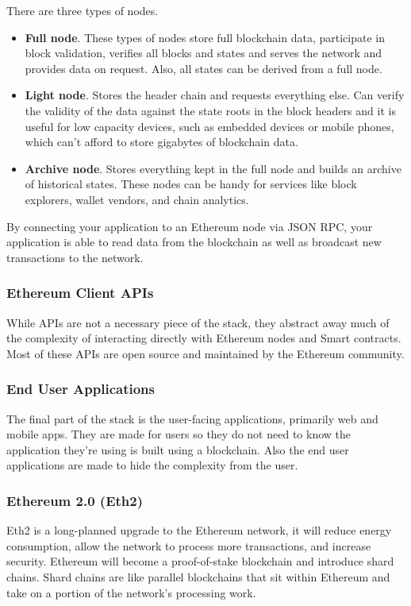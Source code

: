 \documentclass[a4paper, 12pt]{article} %
\begin{document}
            There are three types of nodes.
            \begin{itemize}
                \item \textbf{Full node}. These types of nodes store full blockchain data, participate in block validation, verifies all blocks and states and serves the network and provides data on request. Also, all states can be derived from a full node.
                \item \textbf{Light node}. Stores the header chain and requests everything else. Can verify the validity of the data against the state roots in the block headers and it is useful for low capacity devices, such as embedded devices or mobile phones, which can't afford to store gigabytes of blockchain data.
                \item \textbf{Archive node}. Stores everything kept in the full node and builds an archive of historical states. These nodes can be handy for services like block explorers, wallet vendors, and chain analytics.
            \end{itemize}
            By connecting your application to an Ethereum node via JSON RPC, your application is able to read data from the blockchain as well as broadcast new transactions to the network.

        \subsubsection{Ethereum Client APIs}
            While APIs are not a necessary piece of the stack, they abstract away much of the complexity of interacting directly with Ethereum nodes and Smart contracts.\\
            
            Most of these APIs are open source and maintained by the Ethereum community.

        \subsubsection{End User Applications}
            The final part of the stack is the user-facing applications, primarily web and mobile apps.  They are made for users so they do not need to know the application they're using is built using a blockchain. Also the end user applications are made to hide the complexity from the user.
            
        \subsubsection{Ethereum 2.0 (Eth2)}
            Eth2\cite{eth2} is a long-planned upgrade to the Ethereum network, it will reduce energy consumption, allow the network to process more transactions, and increase security.  Ethereum will become a proof-of-stake blockchain and introduce shard chains. Shard chains are like parallel blockchains that sit within Ethereum and take on a portion of the network's processing work.\\
            
\end{document}
